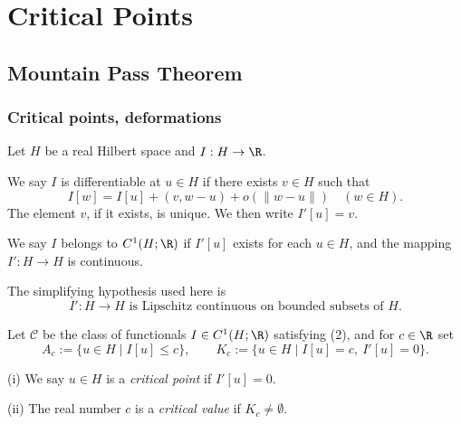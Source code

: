 \section{Critical Points}
\label{sec:critical-points-calculus-of-variations}

\subsection{Mountain Pass Theorem}
\label{sec:mountain-pass-theorem-section}

\subsubsection{Critical points, deformations}

Let $H$ be a real Hilbert space and $I:H\to\R$.

\begin{definition}
\label{def:frechet-derivative-hilbert-space}
We say $I$ is differentiable at $u \in H$ if there exists $v \in H$ such that
\[
I[w] = I[u] + (v, w - u) + o(\|w - u\|) \quad (w \in H).
\tag{1}
\]
The element $v$, if it exists, is unique. We then write $I'[u] = v$.
\end{definition}

\begin{definition}
\label{def:c1-functional-class-hilbert}
We say $I$ belongs to $C^1(H;\R)$ if $I'[u]$ exists for each $u \in H$, and the mapping $I' : H \to H$ is continuous.
\end{definition}

\begin{remark}
\label{rem:lipschitz-derivative-simplification}
The simplifying hypothesis used here is
\[
I' : H \to H \text{ is Lipschitz continuous on bounded subsets of } H.
\tag{2}
\]
\end{remark}

Let $\mathcal C$ be the class of functionals $I\in C^1(H;\R)$ satisfying (2), and for $c\in\R$ set
\[
A_c:=\{u\in H\mid I[u]\leq c\},
\qquad
K_c:=\{u\in H\mid I[u]=c,\ I'[u]=0\}.
\]

\begin{definition}
\label{def:critical-point-critical-value}
(i) We say $u \in H$ is a \textit{critical point} if $I'[u] = 0$.

(ii) The real number $c$ is a \textit{critical value} if $K_c \neq \emptyset$.
\end{definition}

